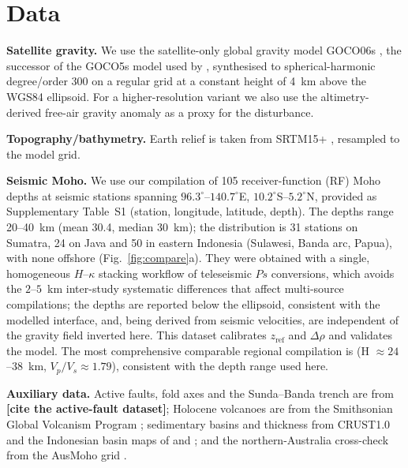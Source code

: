 \documentclass[extra,mreferee]{gji}
\begin{document}
\section{Data}
\textbf{Satellite gravity.} We use the satellite-only global gravity model
{GOCO06s} \citep{kvas2021}, the successor of the {GOCO5s} model used by
\citet{uieda2017}, synthesised to spherical-harmonic degree/order 300 on a regular
grid at a constant height of 4~km above the {WGS84} ellipsoid. For a
higher-resolution variant we also use the altimetry-derived free-air gravity
anomaly \citep{sandwell2014} as a proxy for the disturbance.

\textbf{Topography/bathymetry.} Earth relief is taken from {SRTM15+}
\citep{tozer2019}, resampled to the model grid.

\textbf{Seismic Moho.} We use our compilation of 105 receiver-function
(RF) Moho depths \citep{fauzi2021} at seismic stations spanning
$96.3^{\circ}$--$140.7^{\circ}$E, $10.2^{\circ}$S--$5.2^{\circ}$N, provided as
Supplementary Table~S1 (station, longitude, latitude, depth). The depths range
20--40~km (mean 30.4, median 30~km); the distribution is 31 stations on Sumatra, 24
on Java and 50 in eastern Indonesia (Sulawesi, Banda arc, Papua), with none offshore
(Fig.~\ref{fig:compare}a). They were obtained with a single, homogeneous
$H$--$\kappa$ stacking workflow of teleseismic $Ps$ conversions, which avoids the
$2$--$5$~km inter-study systematic differences that affect multi-source
compilations; the depths are reported below the ellipsoid, consistent with the
modelled interface, and, being derived from seismic velocities, are independent of
the gravity field inverted here. This dataset calibrates $z_{\mathrm{ref}}$
and $\Delta\rho$ and validates the model. The most comprehensive comparable
regional compilation is \citet{zhang2023} (H $\approx24$--$38$~km,
$V_p/V_s\approx1.79$), consistent with the depth range used here.

\textbf{Auxiliary data.} Active faults, fold axes and the Sunda--Banda trench are
from \textbf{[cite the active-fault dataset]}; Holocene volcanoes are from the
Smithsonian Global Volcanism Program \citep{gvp2013}; sedimentary basins and
thickness from {CRUST1.0} \citep{laske2013} and the Indonesian basin maps of
\citet{darman2020} and \citet{esdm2022}; and the northern-Australia cross-check
from the {AusMoho} grid \citep{kennett2011}.
\end{document}
